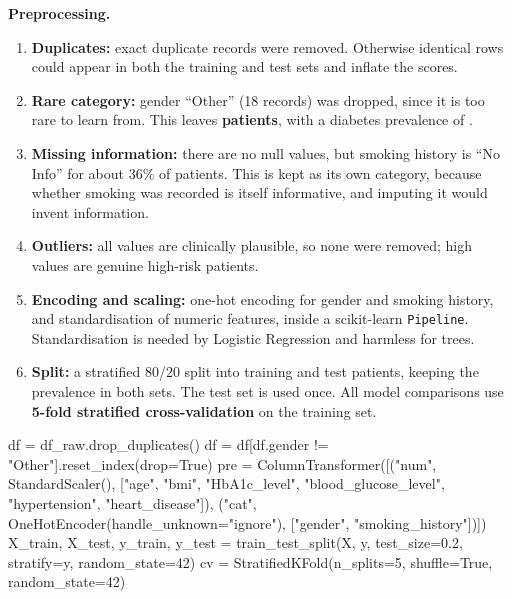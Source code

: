 \textbf{Preprocessing.}
\begin{enumerate}
\item \textbf{Duplicates:} \dbDup{} exact duplicate records were removed. Otherwise identical rows could appear in both
the training and test sets and inflate the scores.
\item \textbf{Rare category:} gender ``Other'' (18 records) was dropped, since it is too rare to learn from. This leaves
\textbf{\dbRowsClean{} patients}, with a diabetes prevalence of \dbPrev.
\item \textbf{Missing information:} there are no null values, but smoking history is ``No Info'' for about 36\% of
patients. This is kept as its own category, because whether smoking was recorded is itself informative, and imputing
it would invent information.
\item \textbf{Outliers:} all values are clinically plausible, so none were removed; high values are genuine high-risk
patients.
\item \textbf{Encoding and scaling:} one-hot encoding for gender and smoking history, and standardisation of numeric
features, inside a scikit-learn \texttt{Pipeline}. Standardisation is needed by Logistic Regression and harmless for
trees.
\item \textbf{Split:} a stratified 80/20 split into \dbTrain{} training and \dbTest{} test patients, keeping the
prevalence in both sets. The test set is used once. All model comparisons use \textbf{5-fold stratified
cross-validation} on the training set.
\end{enumerate}
\begin{pycode}
df = df_raw.drop_duplicates()
df = df[df.gender != "Other"].reset_index(drop=True)
pre = ColumnTransformer([("num", StandardScaler(), ["age", "bmi", "HbA1c_level", "blood_glucose_level",
                                                    "hypertension", "heart_disease"]),
                         ("cat", OneHotEncoder(handle_unknown="ignore"), ["gender", "smoking_history"])])
X_train, X_test, y_train, y_test = train_test_split(X, y, test_size=0.2, stratify=y, random_state=42)
cv = StratifiedKFold(n_splits=5, shuffle=True, random_state=42)
\end{pycode}


